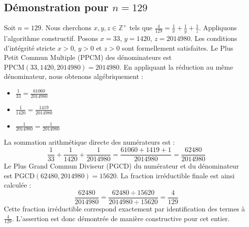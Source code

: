 \documentclass[11pt,a4paper]{article}
\begin{document}
\subsection{Démonstration pour $n = 129$}
Soit $n = 129$. Nous cherchons $x, y, z \in \mathbb{Z}^{+}$ tels que $\frac{4}{129} = \frac{1}{x} + \frac{1}{y} + \frac{1}{z}$.
Appliquons l'algorithme constructif. Posons $x = 33$, $y = 1420$, $z = 2014980$.
Les conditions d'intégrité stricte $x > 0$, $y > 0$ et $z > 0$ sont formellement satisfaites.
Le Plus Petit Commun Multiple (PPCM) des dénominateurs est $\text{PPCM}(33, 1420, 2014980) = 2014980$.
En appliquant la réduction au même dénominateur, nous obtenons algébriquement :
\begin{itemize}
    \item $\frac{1}{33} = \frac{61060}{2014980}$
    \item $\frac{1}{1420} = \frac{1419}{2014980}$
    \item $\frac{1}{2014980} = \frac{1}{2014980}$
\end{itemize}
La sommation arithmétique directe des numérateurs est :
$$ \frac{1}{33} + \frac{1}{1420} + \frac{1}{2014980} = \frac{61060 + 1419 + 1}{2014980} = \frac{62480}{2014980} $$
Le Plus Grand Commun Diviseur (PGCD) du numérateur et du dénominateur est $\text{PGCD}(62480, 2014980) = 15620$.
La fraction irréductible finale est ainsi calculée :
$$ \frac{62480}{2014980} = \frac{62480 \div 15620}{2014980 \div 15620} = \frac{4}{129} $$
Cette fraction irréductible correspond exactement par identification des termes à $\frac{4}{129}$. L'assertion est donc démontrée de manière constructive pour cet entier.
\end{document}
